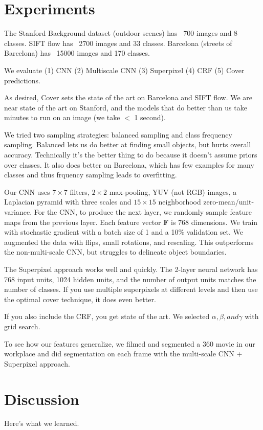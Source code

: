 \documentclass[a4paper]{article}
\begin{document}
\section{Experiments}
The Stanford Background dataset (outdoor scenes) has ~700 images and 8 classes.
SIFT flow has ~2700 images and 33 classes. Barcelona (streets of Barcelona)
has ~15000 images and 170 classes.

We evaluate (1) CNN (2) Multiscale CNN (3) Superpixel (4) CRF (5) Cover
predictions.

As desired, Cover sets the state of the art on Barcelona and SIFT flow. We are
near state of the art on Stanford, and the models that do better than us take
minutes to run on an image (we take $<$ 1 second).

We tried two sampling strategies: balanced sampling and class frequency
sampling. Balanced lets us do better at finding small objects, but hurts overall
accuracy. Technically it's the better thing to do because it doesn't assume
priors over classes. It also does better on Barcelona, which has few examples
for many classes and thus frquency sampling leads to overfitting.

Our CNN uses $7 \times 7$ filters, $2 \times 2$ max-pooling, YUV (not RGB)
images, a Laplacian pyramid with three scales and $15 \times 15$ neighborhood
zero-mean/unit-variance. For the CNN, to produce the next layer, we randomly
sample feature maps from the previous layer. Each feature vector $\mathbf{F}$
is 768 dimensions. We train with stochastic gradient with a batch size of 1
and a 10\% validation set. We augmented the data with flips, small rotations,
and rescaling. This outperforms the non-multi-scale CNN, but struggles to
delineate object boundaries.

The Superpixel approach works well and quickly. The 2-layer neural network has
768 input units, 1024 hidden units, and the number of output units matches the
number of classes. If you use multiple superpixels at different levels and
then use the optimal cover technique, it does even better.

If you also include the CRF, you get state of the art. We selected $\alpha,
\beta, and \gamma$ with grid search.

To see how our features generalize, we filmed and segmented a 360 movie in
our workplace and did segmentation on each frame with the multi-scale CNN +
Superpixel approach.

\section{Discussion}
Here's what we learned.
\end{document}
